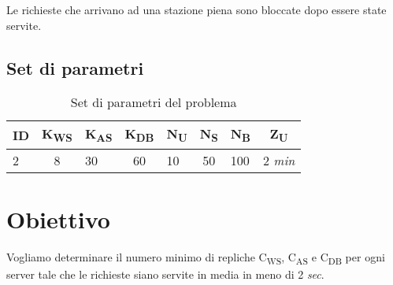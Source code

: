 \documentclass[../main.tex]{subfiles}
\begin{document}
    Le richieste che arrivano ad una stazione piena sono bloccate dopo essere state servite.

    \subsection{Set di parametri}\label{subsec:set-di-parametri}
    \begin{table}[h]
        \centering
        \begin{tabular}{|l|c|l|c|l|c|l|c|}
            \hline
            \textbf{ID} & \textbf{K\textsubscript{WS}} & \textbf{K\textsubscript{AS}} & \textbf{K\textsubscript{DB}}
            & \textbf{N\textsubscript{U}}
            & \textbf{N\textsubscript{S}}
            & \textbf{N\textsubscript{B}}
            & \textbf{Z\textsubscript{U}}\\ [0.5ex]
            \hline
            2           & 8                            & 30                           & 60                           & 10                          & 50                          & 100                         & 2 \textit{min}              \\
            \hline
        \end{tabular}
        \caption{Set di parametri del problema}
        \label{tab:set di parametri}
    \end{table}


    \section{Obiettivo}\label{sec:Obiettivo}
    Vogliamo determinare il numero minimo di repliche C\textsubscript{WS}, C\textsubscript{AS} e C\textsubscript{DB} per ogni server tale che le richieste siano servite in media in meno di 2 \textit{sec}.
\end{document}
